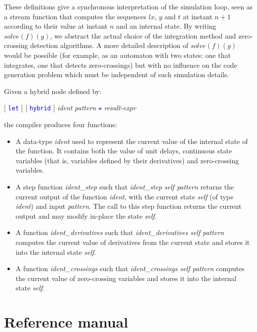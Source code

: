 \documentclass[11pt,titlepage,twoside]{report}
\newcommand{\lx}{\ensuremath{\mathit{lx}}}
\newcommand{\Solve}[2]{\mathit{solve}({#1})({#2})}
\newcommand{\term}[1]{\textcolor{Blue}{\tt #1}}
\newcommand{\nterm}[1]{\textcolor{BrickRed}{\it #1}}
\newcommand{\term}[1]{{\tt #1}}
\newcommand{\nterm}[1]{{\em #1}}
\begin{document}
These definitions give a synchronous interpretation of the simulation loop,
seen as a stream function that computes the sequences $\lx$, $y$ and $t$
at instant $n+1$ according to their value at instant $n$ and an
internal state. By writing $\Solve{f}{g}$, we abstract the
actual choice of the integration method and zero-crossing detection
algorithms. A more detailed description of $\Solve{f}{g}$ would be
possible (for example, as an automaton with two states: one that integrates, 
one that detects zero-crossings) but with no influence on
the code generation problem which must be independent of such simulation
details. 


Given a hybrid node defined by:
\begin{center}
  [ \term{let} ] [ \term{hybrid} ] \nterm{ident} \nterm{pattern} \term{=}
  \nterm{result-expr}
\end{center}
the compiler produces four functions:

\begin{itemize}
\item
  A data-type \nterm{ident} used to represent the current
  value of the internal state of the function. It contains both the
  value of unit delays, continuous state variables (that is, variables
  defined by their derivatives) and zero-crossing variables.
\item
  A step function \nterm{ident\_step} such that
    \nterm{ident\_step self pattern} returns the current output of the function
    \nterm{ident}, with the current state \nterm{self} (of type
    \nterm{ident}) and input \nterm{pattern}. The call to this step
    function returns the current output and may modify in-place
    the state \nterm{self}.
  \item
    A function \nterm{ident\_derivatives} such that
    \nterm{ident\_derivatives self pattern} computes the
    current value of derivatives from the current state and stores it
    into the internal state \nterm{self}.
  \item
    A function \nterm{ident\_crossings} such that
    \nterm{ident\_crossings self pattern} computes the
    current value of zero-crossing variables and stores it into the
    internal state \nterm{self}. 
\end{itemize}

\cleardoublepage
\part{Reference manual\label{refman}}
\cleardoublepage
\end{document}
